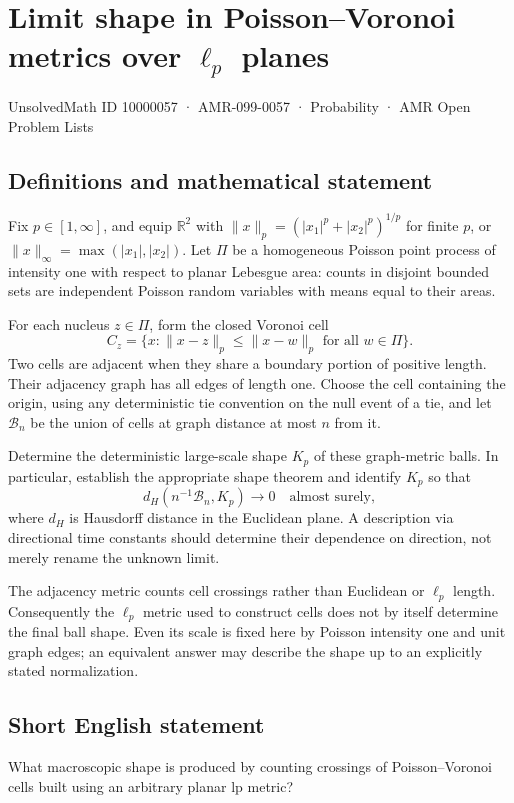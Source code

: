 \documentclass[11pt,a4paper]{article}
\begin{document}
\section*{Limit shape in Poisson–Voronoi metrics over $\ell_p$ planes}\label{10000057}
{\small UnsolvedMath ID 10000057 · AMR-099-0057 · Probability · AMR Open Problem Lists}
\subsection{Definitions and mathematical statement}
Fix $p\in[1,\infty]$, and equip $\mathbb R^2$ with $\|x\|_p=(|x_1|^p+|x_2|^p)^{1/p}$ for finite $p$, or $\|x\|_\infty=\max(|x_1|,|x_2|)$. Let $\Pi$ be a homogeneous Poisson point process of intensity one with respect to planar Lebesgue area: counts in disjoint bounded sets are independent Poisson random variables with means equal to their areas.

For each nucleus $z\in\Pi$, form the closed Voronoi cell
\[
C_z=\{x:\|x-z\|_p\le\|x-w\|_p\text{ for all }w\in\Pi\}.
\]
Two cells are adjacent when they share a boundary portion of positive length. Their adjacency graph has all edges of length one. Choose the cell containing the origin, using any deterministic tie convention on the null event of a tie, and let $\mathcal B_n$ be the union of cells at graph distance at most $n$ from it.

Determine the deterministic large-scale shape $K_p$ of these graph-metric balls. In particular, establish the appropriate shape theorem and identify $K_p$ so that
\[
d_H(n^{-1}\mathcal B_n,K_p)\longrightarrow0
\quad\text{almost surely},
\]
where $d_H$ is Hausdorff distance in the Euclidean plane. A description via directional time constants should determine their dependence on direction, not merely rename the unknown limit.

The adjacency metric counts cell crossings rather than Euclidean or $\ell_p$ length. Consequently the $\ell_p$ metric used to construct cells does not by itself determine the final ball shape. Even its scale is fixed here by Poisson intensity one and unit graph edges; an equivalent answer may describe the shape up to an explicitly stated normalization.
\subsection{Short English statement}
What macroscopic shape is produced by counting crossings of Poisson–Voronoi cells built using an arbitrary planar lp metric?
\end{document}
